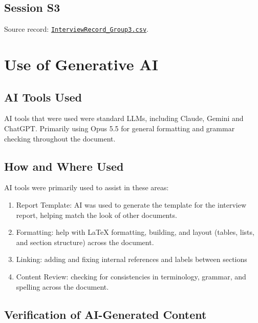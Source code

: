 \documentclass{article}
\begin{document}


\subsection{Session S3}
\label{app:s3}
Source record: \href{https://github.com/JackEaston4/Troitsky-Toolbox/blob/main/docs/CDs/Interviews/InterviewRecords/InterviewRecord_Group3.csv}{\texttt{InterviewRecord\_Group3.csv}}.




\section{Use of Generative AI}
\label{app:ai}

\subsection{AI Tools Used}

AI tools that were used were standard LLMs, including Claude, Gemini and ChatGPT. 
Primarily using Opus 5.5 for general formatting and grammar checking throughout the document.

\subsection{How and Where Used}

AI tools were primarily used to assist in these areas:
\begin{enumerate}
      \item Report Template: AI was used to generate the template for the interview report, helping match the look of other documents.
      \item Formatting: help with LaTeX formatting, building, and layout (tables, lists, and section structure) across the document.
      \item Linking: adding and fixing internal references and labels between sections
      \item Content Review: checking for consistencies in terminology, grammar, and spelling across the document.
\end{enumerate}

\subsection{Verification of AI-Generated Content}
\end{document}
